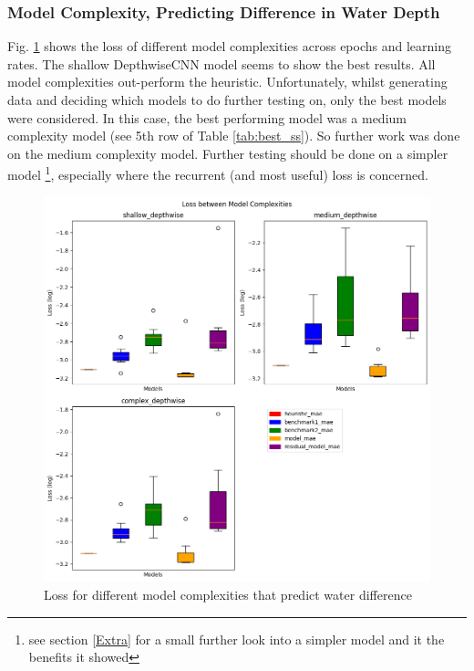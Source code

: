 \subsubsection*{Model Complexity, Predicting Difference in Water Depth}
Fig. \ref{fig:depthwise-complexity} shows the loss of different model complexities across epochs and learning rates. The shallow DepthwiseCNN model seems to show the best results. All model complexities out-perform the heuristic. Unfortunately, whilst generating data and deciding which models to do further testing on, only the best models were considered. In this case, the best performing model was a medium complexity model (see 5th row of Table \ref{tab:best_ss}). So further work was done on the medium complexity model. Further testing should be done on a simpler model \footnote{see section \ref{Extra} for a small further look into a simpler model and it the benefits it showed}, especially where the recurrent (and most useful) loss is concerned. 
\begin{figure}[tbph]
	\centering
	\includegraphics[width=0.7\linewidth, height=0.4\textheight]{Figures/Results/Diff_Complexity_Lr_Epochs/Complexity/Box_model_complexity}
	\caption[Loss Depending on Model Complexity for DepthwiseCNN]{Loss for different model complexities that predict water difference}
	\label{fig:depthwise-complexity}
\end{figure}


